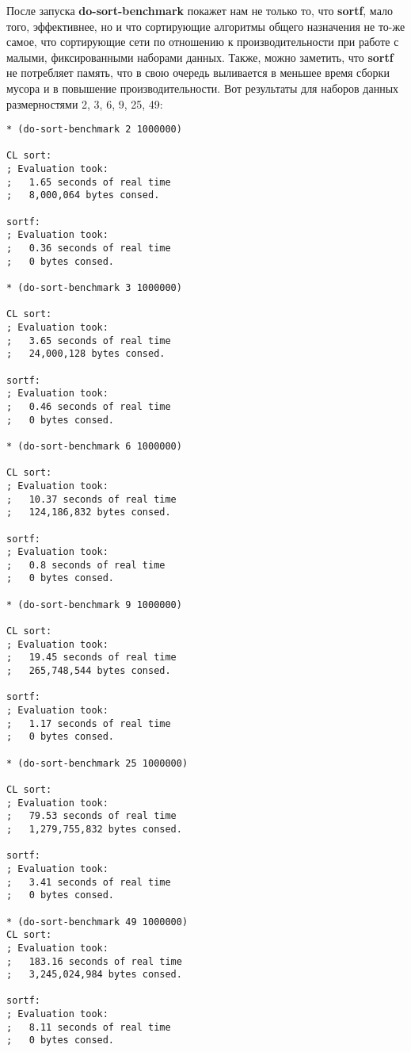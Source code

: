 После запуска \textbf{do-sort-benchmark} покажет нам не только то, что \textbf{sortf}, мало того, эффективнее, но и что сортирующие алгоритмы общего назначения не то-же самое, что сортирующие сети по отношению к производительности при работе с малыми, фиксированными наборами данных. Также, можно заметить, что \textbf{sortf} не потребляет память, что в свою очередь выливается в меньшее время сборки мусора и в повышение производительности. Вот результаты для наборов данных размерностями 2, 3, 6, 9, 25, 49:

\begin{verbatim}
* (do-sort-benchmark 2 1000000)

CL sort:
; Evaluation took:
;   1.65 seconds of real time
;   8,000,064 bytes consed.

sortf:
; Evaluation took:
;   0.36 seconds of real time
;   0 bytes consed. 

* (do-sort-benchmark 3 1000000)

CL sort:
; Evaluation took:
;   3.65 seconds of real time
;   24,000,128 bytes consed.

sortf:
; Evaluation took:
;   0.46 seconds of real time
;   0 bytes consed. 

* (do-sort-benchmark 6 1000000)

CL sort:
; Evaluation took:
;   10.37 seconds of real time
;   124,186,832 bytes consed.

sortf:
; Evaluation took:
;   0.8 seconds of real time
;   0 bytes consed. 

* (do-sort-benchmark 9 1000000)

CL sort:
; Evaluation took:
;   19.45 seconds of real time
;   265,748,544 bytes consed.

sortf:
; Evaluation took:
;   1.17 seconds of real time
;   0 bytes consed. 

* (do-sort-benchmark 25 1000000)

CL sort:
; Evaluation took:
;   79.53 seconds of real time
;   1,279,755,832 bytes consed.

sortf:
; Evaluation took:
;   3.41 seconds of real time
;   0 bytes consed. 

* (do-sort-benchmark 49 1000000)
CL sort:
; Evaluation took:
;   183.16 seconds of real time
;   3,245,024,984 bytes consed.

sortf:
; Evaluation took:
;   8.11 seconds of real time
;   0 bytes consed. 
\end{verbatim}

